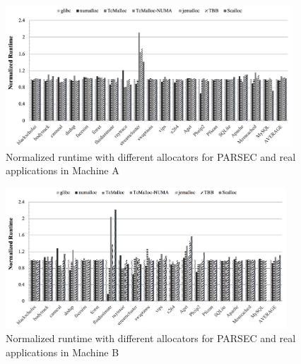 \begin{figure}[H]
    \centering
    \includegraphics[width=\textwidth,height=200]{figure/2-node-parsec-perf.png}
    \caption{Normalized runtime with different allocators for PARSEC and real applications in Machine A}
    \label{2node-parsec-perf}
\end{figure}

\begin{figure}[H]
    \centering
    \includegraphics[width=\textwidth,height=200]{figure/8-node-parsec-perf.png}
    \caption{Normalized runtime with different allocators for PARSEC and real applications in Machine B}
    \label{8node-parsec-perf}
\end{figure}

